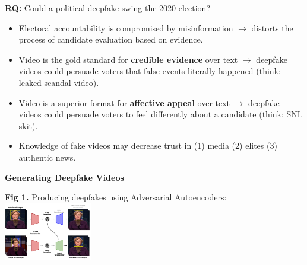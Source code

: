 \documentclass[a0,landscape]{a0poster}
\begin{document}
\begin{multicols}{3} 

{\Huge
\noindent \textbf{RQ:} Could a political deepfake swing the 2020 election? \vspace{1em}
}

\begin{tcolorbox}[colback=black!0,colframe=green!40!black,
title=\Huge{\textbf{Motivation}},
boxrule=2pt,arc=0.5em,boxsep=4mm]
\Large{
\begin{itemize}
\item Electoral accountability is compromised by misinformation $\rightarrow$ distorts the process of candidate evaluation based on evidence.
\item Video is the gold standard for \textbf{credible evidence} over text $\rightarrow$ deepfake videos could persuade voters that false events literally happened (think: leaked scandal video).
\item Video is a superior format for \textbf{affective appeal} over text $\rightarrow$ deepfake videos could persuade voters to feel differently about a candidate (think: SNL skit).
\item Knowledge of fake videos may decrease trust in (1) media (2) elites (3) authentic news.
\end{itemize}
}
\end{tcolorbox}

{\Huge \vspace{1em}
\noindent \textbf{Generating Deepfake Videos}
}

\begin{center}\vspace{0.5cm}
{\Large \textbf{Fig 1.} Producing deepfakes using Adversarial Autoencoders:}
    \includegraphics[width=0.29\textwidth]{faceswap_illustration.pdf}
\end{center}


\end{multicols}
\end{document}
